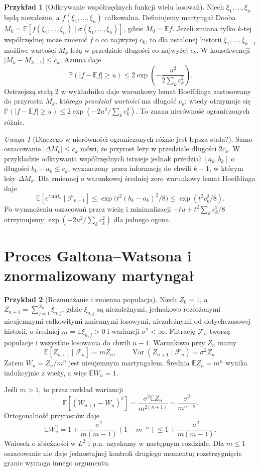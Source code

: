 \documentclass[11pt,a4paper,oneside]{report}
\numberwithin{equation}{chapter}
\theoremstyle{plain}
\theoremstyle{definition}
\newtheorem{przyklad}{Przykład}[chapter]
\theoremstyle{remark}
\newtheorem{uwaga}{Uwaga}[chapter]
\newcommand{\Prob}{\mathbb{P}}
\newcommand{\E}{\mathbb{E}}
\newcommand{\Var}{\operatorname{Var}}
\begin{document}
\begin{przyklad}[Odkrywanie współrzędnych funkcji wielu losowań]
Niech $\xi_1,\ldots,\xi_n$ będą niezależne, a
$f(\xi_1,\ldots,\xi_n)$ całkowalna.
Definiujemy martyngał Dooba
$M_k=\E[f(\xi_1,\ldots,\xi_n)\mid
\sigma(\xi_1,\ldots,\xi_k)]$, gdzie $M_0=\E f$.
Jeżeli zmiana tylko $k$-tej współrzędnej
może zmienić $f$ o co najwyżej $c_k$,
to dla ustalonej historii $\xi_1,\ldots,\xi_{k-1}$
możliwe wartości $M_k$ leżą w przedziale długości
co najwyżej $c_k$. W konsekwencji
$|M_k-M_{k-1}|\leq c_k$; Azuma daje
\[
\Prob(|f-\E f|\geq u)\leq
2\exp\left(-\frac{u^2}{2\sum_kc_k^2}\right).
\]
Ostrzejszą stałą $2$ w wykładniku daje
warunkowy lemat Hoeffdinga zastosowany do
przyrostu $M_k$, którego \emph{przedział wartości}
ma długość $c_k$; wtedy otrzymuje się
$\Prob(|f-\E f|\geq u)\leq
2\exp(-2u^2/\sum_kc_k^2)$.
To znana nierówność ograniczonych różnic.
\end{przyklad}


\begin{uwaga}[Dlaczego w nierówności ograniczonych różnic jest lepsza stała?]
Samo oszacowanie $|\Delta M_k|\leq c_k$ mówi,
że przyrost leży w przedziale długości $2c_k$.
W przykładzie odkrywania współrzędnych
istnieje jednak przedział $[a_k,b_k]$
o długości $b_k-a_k\leq c_k$, wyznaczony przez
informację do chwili $k-1$, w którym leży
$\Delta M_k$. Dla zmiennej o warunkowej
średniej zero warunkowy lemat Hoeffdinga daje
\[
 \E[e^{t\Delta M_k}\mid\mathcal F_{k-1}]
 \leq\exp\bigl(t^2(b_k-a_k)^2/8\bigr)
 \leq\exp(t^2c_k^2/8).
\]
Po wymnożeniu oszacowań przez wieżę i minimalizacji
$-tu+t^2\sum_kc_k^2/8$ otrzymujemy
$\exp(-2u^2/\sum_kc_k^2)$ dla jednego ogona.
\end{uwaga}

\section{Proces Galtona--Watsona i znormalizowany martyngał}

\begin{przyklad}[Rozmnażanie i zmienna populacja]
Niech $Z_0=1$, a
$Z_{n+1}=\sum_{j=1}^{Z_n}\xi_{n,j}$, gdzie
$\xi_{n,j}$ są niezależnymi, jednakowo rozłożonymi
nieujemnymi całkowitymi zmiennymi losowymi,
niezależnymi od dotychczasowej historii,
o średniej $m=\E\xi_{n,j}>0$ i wariancji
$\sigma^2<\infty$. Filtrację $\mathcal F_n$
tworzą populacje i wszystkie losowania do
chwili $n-1$. Warunkowo przy $Z_n$ mamy
\[
\E[Z_{n+1}\mid\mathcal F_n]=mZ_n,
\qquad \Var(Z_{n+1}\mid\mathcal F_n)=\sigma^2 Z_n.
\]
Zatem $W_n=Z_n/m^n$ jest nieujemnym martyngałem.
Średnia $\E Z_n=m^n$ wynika indukcyjnie z wieży,
a więc $\E W_n=1$.

Jeśli $m>1$, to przez rozkład wariancji
\[
\E[(W_{n+1}-W_n)^2]
=\frac{\sigma^2\E Z_n}{m^{2(n+1)}}
=\frac{\sigma^2}{m^{n+2}}.
\]
Ortogonalność przyrostów daje
\[
\E W_n^2=1+\frac{\sigma^2}{m(m-1)}(1-m^{-n})
\leq1+\frac{\sigma^2}{m(m-1)}.
\]
Wniosek o zbieżności w $L^2$ i p.n. uzyskamy
w następnym rozdziale. Dla $m\leq1$ oszacowanie
nie daje jednostajnej kontroli drugiego momentu;
rozstrzygnięcie granic wymaga innego argumentu.
\end{przyklad}
\end{document}
